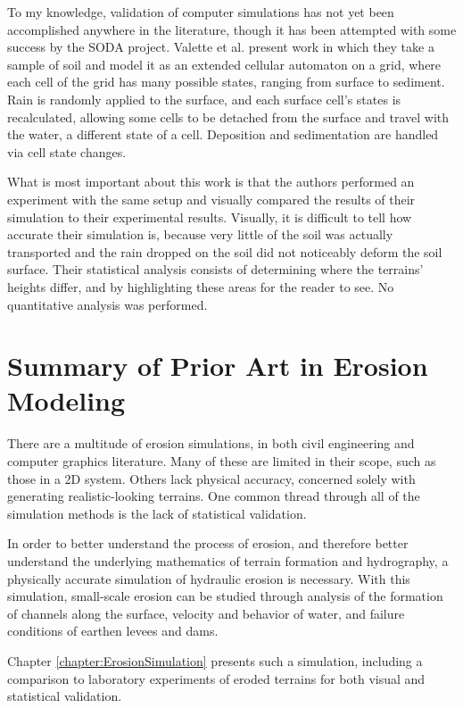 To my knowledge, validation of computer simulations has not yet been accomplished anywhere in the literature, though it has been attempted with some success by the SODA project. Valette et al. \cite{Valette-SoDA} present work in which they take a sample of soil and model it as an extended cellular automaton on a grid, where each cell of the grid has many possible states, ranging from surface to sediment. Rain is randomly applied to the surface, and each surface cell's states is recalculated, allowing some cells to be detached from the surface and travel with the water, a different state of a cell. Deposition and sedimentation are handled via cell state changes.

What is most important about this work is that the authors performed an experiment with the same setup and visually compared the results of their simulation to their experimental results. Visually, it is difficult to tell how accurate their simulation is, because very little of the soil was actually transported and the rain dropped on the soil did not noticeably deform the soil surface. Their statistical analysis consists of determining where the terrains' heights differ, and by highlighting these areas for the reader to see. No quantitative analysis was performed. 



% 


\section{Summary of Prior Art in Erosion Modeling}

There are a multitude of erosion simulations, in both civil engineering and computer graphics literature.
Many of these are limited in their scope, such as those in a 2D system. Others lack physical
accuracy, concerned solely with generating realistic-looking terrains. One common thread through
all of the simulation methods is the lack of statistical validation.

In order to better understand the process of erosion, and therefore better understand
the underlying mathematics of terrain formation and hydrography, a physically accurate
simulation of hydraulic erosion is necessary. With this simulation, small-scale erosion
can be studied through analysis of the formation of channels along the surface, 
velocity and behavior of water, and failure conditions of earthen levees and dams.

Chapter \ref{chapter:ErosionSimulation} presents
such a simulation, including a comparison to laboratory experiments of eroded terrains
for both visual and statistical validation.






